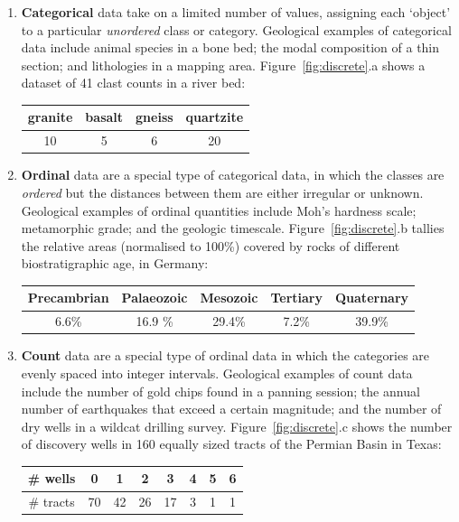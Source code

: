 \begin{enumerate}

\item\textbf{Categorical} data take on a limited number of values,
  assigning each `object' to a particular \emph{unordered} class or
  category. Geological examples of categorical data include animal
  species in a bone bed; the modal composition of a thin section; and
  lithologies in a mapping area. Figure~\ref{fig:discrete}.a shows a
  dataset of 41 clast counts in a river bed:
  \begin{center}
    \begin{tabular}{cccc}
      granite & basalt & gneiss & quartzite \\ \hline
      10 & 5 & 6 & 20  
    \end{tabular}
  \end{center}

\item\textbf{Ordinal} data are a special type of categorical data, in
  which the classes are \emph{ordered} but the distances between them
  are either irregular or unknown. Geological examples of ordinal
  quantities include Moh's hardness scale; metamorphic grade; and the
  geologic timescale. Figure~\ref{fig:discrete}.b tallies the relative
  areas (normalised to 100\%) covered by rocks of different
  biostratigraphic age, in Germany:
  \begin{center}
    \begin{tabular}{ccccc}
      Precambrian & Palaeozoic & Mesozoic & Tertiary & Quaternary\\ \hline
      6.6\% & 16.9 \% & 29.4\% & 7.2\% & 39.9\%
    \end{tabular}
  \end{center}

\item\textbf{Count} data are a special type of ordinal data in which
  the categories are evenly spaced into integer intervals. Geological
  examples of count data include the number of gold chips found in a
  panning session; the annual number of earthquakes that exceed a
  certain magnitude; and the number of dry wells in a wildcat drilling
  survey. Figure~\ref{fig:discrete}.c shows the number of discovery
  wells in 160 equally sized tracts of the Permian Basin in Texas:
  \begin{center}
    \begin{tabular}{c|ccccccc}
     \# wells & 0 & 1 & 2 & 3 & 4 & 5 & 6 \\ \hline
     \# tracts & 70 & 42 & 26 & 17 & 3 & 1 & 1
    \end{tabular}
  \end{center}

\end{enumerate}

